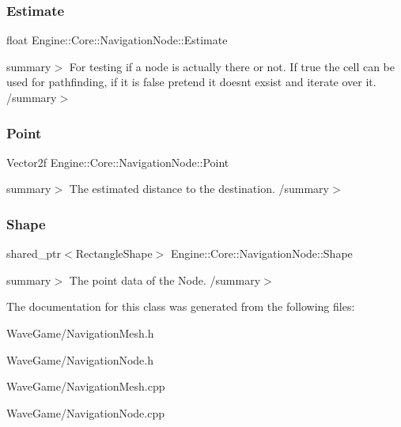 \subsubsection{\texorpdfstring{Estimate}{Estimate}}
{\footnotesize\ttfamily float Engine\+::\+Core\+::\+Navigation\+Node\+::\+Estimate}

summary$>$ For testing if a node is actually there or not. If true the cell can be used for pathfinding, if it is false pretend it doesn\textquotesingle{}t exsist and iterate over it. /summary$>$ \mbox{\label{struct_engine_1_1_core_1_1_navigation_node_a09e7506d996f8bd91b478f3e013fd48e}} 
\subsubsection{\texorpdfstring{Point}{Point}}
{\footnotesize\ttfamily Vector2f Engine\+::\+Core\+::\+Navigation\+Node\+::\+Point}

summary$>$ The estimated distance to the destination. /summary$>$ \mbox{\label{struct_engine_1_1_core_1_1_navigation_node_a7a1470734947944ba351df516e2a7cc1}} 
\subsubsection{\texorpdfstring{Shape}{Shape}}
{\footnotesize\ttfamily shared\+\_\+ptr$<$Rectangle\+Shape$>$ Engine\+::\+Core\+::\+Navigation\+Node\+::\+Shape}

summary$>$ The point data of the Node. /summary$>$ 

The documentation for this class was generated from the following files\+:\begin{DoxyCompactItemize}
\item 
Wave\+Game/Navigation\+Mesh.\+h\item 
Wave\+Game/Navigation\+Node.\+h\item 
Wave\+Game/Navigation\+Mesh.\+cpp\item 
Wave\+Game/Navigation\+Node.\+cpp\end{DoxyCompactItemize}
